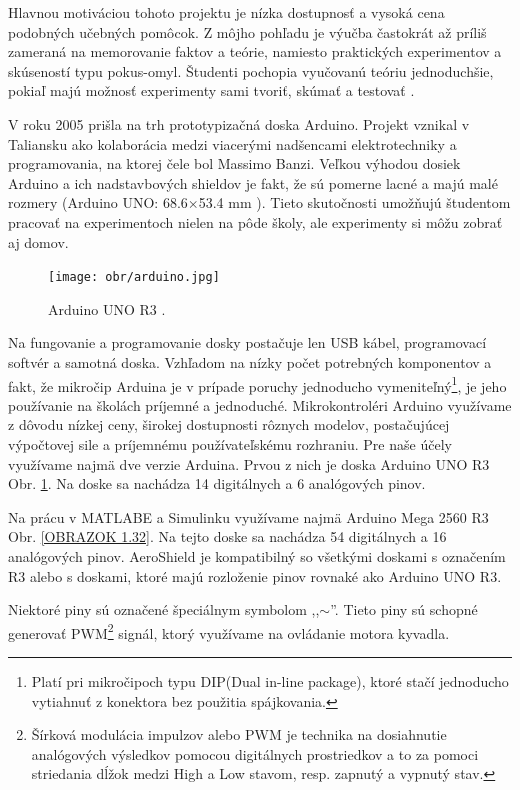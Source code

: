 Hlavnou motiváciou tohoto projektu je nízka dostupnosť a vysoká cena podobných učebných pomôcok. Z môjho pohľadu je výučba častokrát až príliš zameraná na memorovanie faktov a teórie, namiesto praktických experimentov a skúseností typu pokus-omyl. Študenti pochopia vyučovanú teóriu jednoduchšie, pokiaľ majú možnosť experimenty sami tvoriť, skúmať a testovať \cite{Dhanapal2013ASO}. 

V roku 2005 prišla na trh prototypizačná doska Arduino. Projekt vznikal v Taliansku ako kolaborácia medzi viacerými nadšencami elektrotechniky a programovania, na ktorej čele bol Massimo Banzi. Veľkou výhodou dosiek Arduino a ich nadstavbových shieldov je fakt, že sú pomerne lacné a majú malé rozmery (Arduino UNO: 68.6$\times$53.4 mm \cite{UNO}). Tieto skutočnosti umožňujú študentom pracovať na experimentoch nielen na pôde školy, ale experimenty si môžu zobrať aj domov. 

\begin{figure}[!tbh]
	\centering
	\texttt{[image: obr/arduino.jpg]}
	\caption{{Arduino UNO R3 \cite{UNOFOTO}.}}\label{OBRAZOK 1.3}
\end{figure}

Na fungovanie a programovanie dosky postačuje len USB kábel, programovací softvér a samotná doska. Vzhľadom na nízky počet potrebných komponentov a fakt, že mikročip Arduina je v prípade poruchy jednoducho vymeniteľný\footnote[2]{Platí pri mikročipoch typu DIP(Dual in-line package), ktoré stačí jednoducho vytiahnuť z konektora bez použitia spájkovania.}, je jeho používanie na školách príjemné a jednoduché. Mikrokontroléri Arduino využívame z dôvodu nízkej ceny, širokej dostupnosti rôznych modelov, postačujúcej výpočtovej sile a príjemnému používateľskému rozhraniu. Pre naše účely využívame najmä dve verzie Arduina. Prvou z nich je doska Arduino UNO R3  Obr. \ref{OBRAZOK 1.3}. Na doske sa nachádza 14 digitálnych a 6 analógových pinov.

Na prácu v MATLABE a Simulinku využívame najmä Arduino Mega 2560 R3 Obr. \ref{OBRAZOK 1.32}. Na tejto doske sa nachádza 54 digitálnych a 16 analógových pinov. AeroShield je kompatibilný so všetkými doskami s označením R3 alebo s doskami, ktoré majú rozloženie pinov rovnaké ako Arduino UNO R3. 

Niektoré piny sú označené špeciálnym symbolom ,,$\sim$''. Tieto piny sú schopné generovať PWM\footnote[3]{Šírková modulácia impulzov alebo PWM je technika na dosiahnutie analógových výsledkov pomocou digitálnych prostriedkov a to za pomoci striedania dĺžok medzi High a Low stavom, resp. zapnutý a vypnutý stav.} signál, ktorý využívame na ovládanie motora kyvadla.

